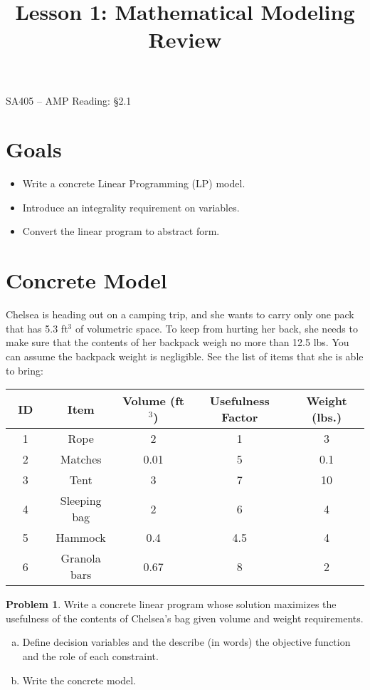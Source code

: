 \documentclass[12pt]{article}
\makeatletter
\theoremstyle{definition}
\newtheorem{problem}{Problem}
\newcommand{\graphbox}[5]%
{
\begin{tikzpicture}
     [>=latex,scale=#5]
     
     \draw [->,very thick] (#1, 0) -- (#2, 0) node[right] {$x$};
     \draw [->,very thick] (0, #3) -- (0, #4) node[above] {$y$};
     
     \draw[step=1cm,thick,dotted] (#1,#3) grid (#2,#4);
   \end{tikzpicture}
   }
\renewcommand{\maketitle}{
  \noindent SA405 -- AMP \hfill  Reading: \S 2.1 \\

  \begin{center}\Large{\textbf{\@title}}\end{center}
}
\makeatother
\begin{document}

\title{Lesson 1:  Mathematical Modeling Review}


\maketitle

\section{Goals}
\begin{itemize}
\item  Write a concrete Linear Programming (LP) model.
\item  Introduce an integrality requirement on variables.
\item  Convert the linear program to abstract form.
\end{itemize}

\section{Concrete Model}

Chelsea is heading out on a camping trip, and she wants to carry only one pack that has 5.3 ft$^3$ of volumetric space. To keep from hurting her back, she needs to make sure that the contents of her backpack weigh no more than 12.5 lbs. You can assume the backpack weight is negligible. See the list of items that she is able to bring:


\begin{center}
\begin{tabular}{|c|c |c| c| c|}
\hline
~ID~ & Item & Volume (ft$^3$) & Usefulness Factor & Weight (lbs.)\\ \hline
1 & Rope & 2 & 1 & 3 \\ \hline
2 & Matches & 0.01 & 5 & 0.1 \\  \hline
3 & Tent & 3 & 7 & 10   \\ \hline
4 & Sleeping bag & 2 & 6 & 4   \\ \hline
5 & Hammock & 0.4 & 4.5 & 4   \\ \hline
6 & Granola bars & 0.67 & 8 & 2   \\ \hline
\end{tabular}
\end{center}

\begin{problem}  Write a concrete linear program whose solution maximizes the usefulness of the contents of Chelsea's bag given volume and weight requirements.

\begin{enumerate}[a)]
\item Define decision variables and the describe (in words) the objective function and the role of each constraint. 

\pagebreak

\item Write the concrete model.
\end{enumerate}
\end{problem}
\end{document}
